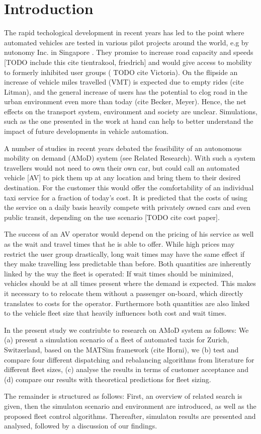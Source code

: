 \section{Introduction}

The rapid techological development in recent years has led to the point where
automated vehicles are tested in various pilot projects around the world, e.g by
nutonomy Inc. in Singapore \citep{ackerman2017hail}. They promise to increase road
capacity and speeds
[TODO include this cite tientrakool, friedrich] and would give access to mobility to formerly
inhibited user groups ( TODO cite Victoria). On the flipside an increase of vehicle
miles travelled (VMT) is expected due to empty rides (cite Litman), and the general increase
of users has the potential to clog road in the urban environment even more than today (cite Becker, Meyer).
Hence, the net effects on
the transport system, environment and society are unclear. Simulations, such as
the one presented in the work at hand can help to better understand the impact
of future developments in vehicle automation.

A number of studies in recent years debated the feasibility of an autonomous
mobility on demand (AMoD) system (see Related Research). With such a system travellers
would not need to own their own car, but could call an automated vehicle [AV] to pick
them up at any location and bring them to their desired destination. For the customer
this would offer the comfortability of an individual taxi service
for a fraction of today's cost. It is predicted that the costs of using the
service on a daily basis heavily compete with privately owned cars and even
public transit, depending on the use scenario [TODO cite cost paper].

The success of an AV operator would depend on the pricing of his service
as well as the wait and travel times that he is able to offer. While high prices
may restrict the user group drastically, long wait times may have the same effect
if they make travelling less predictable than before. Both quantities are inherently
linked by the way the fleet is operated: If wait times should be minimized, vehicles
should be at all times present where the demand is expected. This makes it necessary to to
relocate them without a passenger on-board, which directly translates to costs for
the operator. Furthermore both quantities are also linked to the vehicle fleet
size that heavily influences both cost and wait times.

In the present study we contriubte to research on AMoD system as follows: We
(a) present a simulation scenario of a fleet of automated taxis for Zurich, Switzerland,
based on the MATSim framework (cite Horni), we (b) test and compare four different dispatching
and rebalancing algorithms from literature for different fleet sizes, (c) analyse the results
in terms of customer acceptance and (d) compare our results with theoretical
predictions for fleet sizing.

The remainder is structured as follows: First, an overview of related search is
given, then the simulaton scenario and environment are introduced, as well as the
proposed fleet control algorithms. Thereafter, simulaton results are presented and
analysed, followed by a discussion of our findings.
